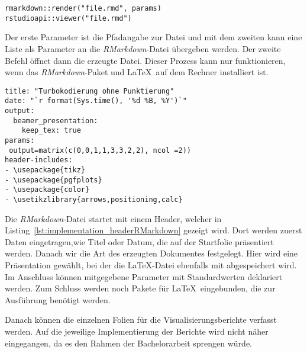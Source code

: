 \begin{lstlisting}[caption=Erzeugung und Öffnung des PDF-Berichts, label={lst:implementation_renderOpen}, float=!th]
rmarkdown::render("file.rmd", params)
rstudioapi::viewer("file.rmd")
\end{lstlisting}

Der erste Parameter ist die Pfadangabe zur Datei und mit dem zweiten kann eine Liste als Parameter an die \emph{RMarkdown}-Datei übergeben werden. Der zweite Befehl öffnet dann die erzeugte Datei. Dieser Prozess kann nur funktionieren, wenn das \emph{RMarkdown}-Paket und \LaTeX\ auf dem Rechner installiert ist.

\begin{lstlisting}[caption=Header der \emph{RMardown}-Datei, label={lst:implementation_headerRMarkdown}, float=!th]
title: "Turbokodierung ohne Punktierung"
date: "`r format(Sys.time(), '%d %B, %Y')`"
output: 
  beamer_presentation:
    keep_tex: true
params:
 output=matrix(c(0,0,1,1,3,3,2,2), ncol =2))
header-includes:
- \usepackage{tikz}
- \usepackage{pgfplots}
- \usepackage{color}
- \usetikzlibrary{arrows,positioning,calc}
\end{lstlisting}

Die \emph{RMarkdown}-Datei startet mit einem Header, welcher in Listing~\ref{lst:implementation_headerRMarkdown} gezeigt wird. Dort werden zuerst Daten eingetragen,wie Titel oder Datum, die auf der Startfolie präsentiert werden. Danach wir die Art des erzeugten Dokumentes festgelegt. Hier wird eine Präsentation gewählt, bei der die \LaTeX -Datei ebenfalls mit abgespeichert wird. Im Anschluss können mitgegebene Parameter mit Standardwerten deklariert werden. Zum Schluss werden noch Pakete für \LaTeX\ eingebunden, die zur Ausführung benötigt werden.

Danach können die einzelnen Folien für die Visualisierungsberichte verfasst werden. Auf die jeweilige Implementierung der Berichte wird nicht näher eingegangen, da es den Rahmen der Bachelorarbeit sprengen würde. 


